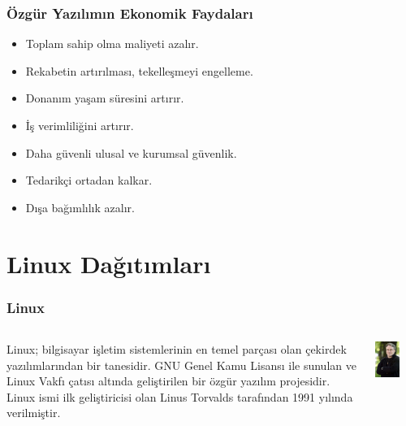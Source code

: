 \documentclass[english,svgnames,notes=hide,12pt]{beamer}
\begin{document}
\begin{frame}
\frametitle{Özgür Yazılımın Ekonomik Faydaları}
\begin{itemize}[<+->]
    \item Toplam sahip olma maliyeti azalır.
    \item Rekabetin artırılması, tekelleşmeyi engelleme.
  \item Donanım yaşam süresini artırır.
    \item İş verimliliğini artırır.
   \item Daha güvenli ulusal ve kurumsal güvenlik.
   \item Tedarikçi ortadan kalkar.
 \item Dışa bağımlılık azalır. 
\end{itemize}
\end{frame}




\section{Linux Dağıtımları}

\begin{frame}
\frametitle{Linux}
\begin{columns}
\begin{column}{0.6\textwidth}
Linux; bilgisayar işletim sistemlerinin en temel parçası olan çekirdek yazılımlarından bir tanesidir. GNU Genel Kamu Lisansı ile sunulan ve Linux Vakfı çatısı altında geliştirilen bir özgür yazılım projesidir. Linux ismi ilk geliştiricisi olan Linus Torvalds tarafından 1991 yılında verilmiştir.
\end{column}

\begin{column}{0.4\textwidth}
\includegraphics[width=0.6\textwidth]{imgs/linus}
\end{column}

\end{columns}

\end{frame}
\end{document}
